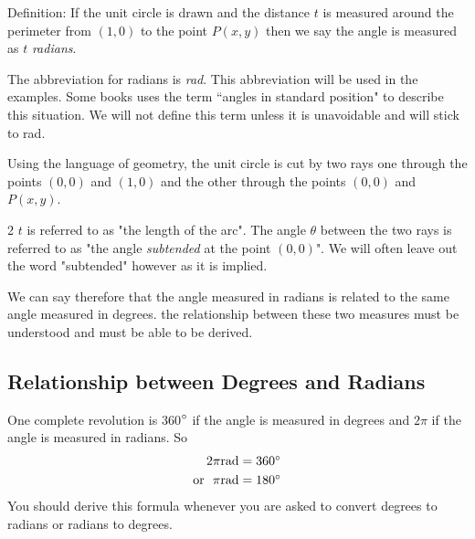 Definition: If the unit circle is drawn and the distance $t$ is measured around the perimeter from $\left (1 ,0\right )$ to the point $P (x ,y)$ then we say the angle is measured as $t$ \emph{radians}. 

The abbreviation for radians is \textit{rad}. This abbreviation will be used in the examples.
Some books uses the term ``angles in standard position" to describe this situation. We
will not define this term unless it is unavoidable and will stick to rad.

Using the language of geometry, the unit circle is cut by two rays one through the points $\left (0 ,0\right )$ and $\left (1 ,0\right )$ and the other through the points $\left (0 ,0\right )$ and $P \left (x ,y\right )$.  
\columnsep =30pt
\begin {multicols}{2}
\setlength\fboxrule{0in}\setlength\fboxsep{0.2in}
$t$ is referred to as "the length of the arc". The
angle $\theta $ between the two rays is referred to as "the angle \emph{subtended} at the point $\left (0 ,0\right )$". We will often leave out the word "subtended" however as it is implied. 
\end {multicols}
We can say therefore that the angle measured in radians is related to the same angle measured in degrees. the relationship between these two measures must be understood and must be able to be derived. 

\subsection*{Relationship between Degrees and Radians}
One complete revolution is 360$\mbox{{\ensuremath{{}^\circ}}}$ if the angle is measured in degrees and $2 \pi $ if the angle is measured in radians. So
\begin{align*}2 \pi \text{}\mbox{rad} &  =  360 \mbox{{\ensuremath{{}^\circ}}} \\
\text{or\  \ }\pi \text{}\mbox{rad} &  =  180 \mbox{{\ensuremath{{}^\circ}}}\end{align*}
You should derive this formula whenever you are asked to convert degrees to radians or radians
to degrees. 

